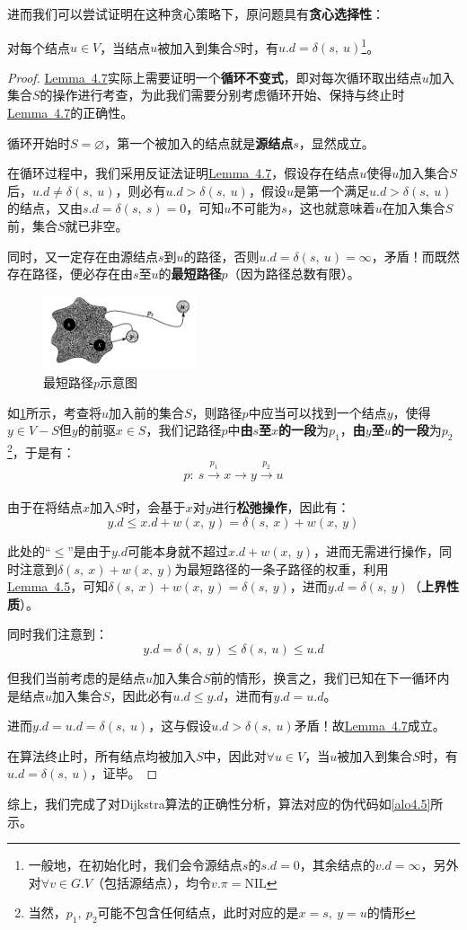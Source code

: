 \documentclass[12pt,a4paper,violet,oneside]{bbe}
\begin{document}
进而我们可以尝试证明在这种贪心策略下，原问题具有\textbf{贪心选择性}：
\begin{lemma}\label{le4.2}
	对每个结点$u\in V$，当结点$u$被加入到集合$S$时，有$u.d=\delta(s,~u)$\footnote{一般地，在初始化时，我们会令源结点$s$的$s.d=0$，其余结点的$v.d=\infty$，另外对$\forall v\in G.V$（包括源结点），均令$v.\pi=\text{NIL}$}。
\end{lemma}
\begin{proof}
	\hyperref[le4.2]{Lemma~4.7}实际上需要证明一个\textbf{循环不变式}，即对每次循环取出结点$u$加入集合$S$的操作进行考查，为此我们需要分别考虑循环开始、保持与终止时\hyperref[le4.2]{Lemma~4.7}的正确性。
	
	循环开始时$S=\varnothing$，第一个被加入的结点就是\textbf{源结点}$s$，显然成立。
	
	在循环过程中，我们采用反证法证明\hyperref[le4.2]{Lemma~4.7}，假设存在结点$u$使得$u$加入集合$S$后，$u.d\ne \delta(s,~u)$，则必有$u.d>\delta(s,~u)$，假设$u$是第一个满足$u.d>\delta(s,~u)$的结点，又由$s.d=\delta(s,~s)=0$，可知$u$不可能为$s$，这也就意味着$u$在加入集合$S$前，集合$S$就已非空。
	
	同时，又一定存在由源结点$s$到$u$的路径，否则$u.d=\delta(s,~u)=\infty$，矛盾！而既然存在路径，便必存在由$s$至$u$的\textbf{最短路径}$p$（因为路径总数有限）。
	\begin{figure}[!htbp]
		\centering
		\includegraphics[width=0.4\textwidth]{fig4.1}
		\caption{最短路径$p$示意图}
		\label{fig4.1}
	\end{figure}

如\cref{fig4.1}所示，考查将$u$加入前的集合$S$，则路径$p$中应当可以找到一个结点$y$，使得$y\in V-S$但$y$的前驱$x\in S$，我们记路径$p$中\textbf{由$s$至$x$的一段}为$p_1$，\textbf{由$y$至$u$的一段}为$p_2$\footnote{当然，$p_1,~p_2$可能不包含任何结点，此时对应的是$x=s,~y=u$的情形}，于是有：
$$
p:~s\xrightarrow[]{~p_1~}x\to y\xrightarrow[]{~p_2~}u
$$

由于在将结点$x$加入$S$时，会基于$x$对$y$进行\textbf{松弛操作}，因此有：
$$
y.d\leqslant x.d+w(x,~y)=\delta(s,~x)+w(x,~y)
$$

此处的“$\leqslant$”是由于$y.d$可能本身就不超过$x.d+w(x,~y)$，进而无需进行操作，同时注意到$\delta(s,~x)+w(x,~y)$为最短路径的一条子路径的权重，利用\hyperref[le4.1]{Lemma~4.5}，可知$\delta(s,~x)+w(x,~y)=\delta(s,~y)$，进而$y.d=\delta(s,~y)$（\textbf{上界性质}）。

同时我们注意到：
$$
y.d=\delta(s,~y)\leqslant\delta(s,~u)\leqslant u.d
$$

但我们当前考虑的是结点$u$加入集合$S$前的情形，换言之，我们已知在下一循环内是结点$u$加入集合$S$，因此必有$u.d\leqslant y.d$，进而有$y.d=u.d$。

进而$y.d=u.d=\delta(s,~u)$，这与假设$u.d>\delta(s,~u)$矛盾！故\hyperref[le4.2]{Lemma~4.7}成立。

在算法终止时，所有结点均被加入$S$中，因此对$\forall u\in V$，当$u$被加入到集合$S$时，有$u.d=\delta(s,~u)$，证毕。
\end{proof}

综上，我们完成了对Dijkstra算法的正确性分析，算法对应的伪代码如\cref{alo4.5}所示。
\end{document}

